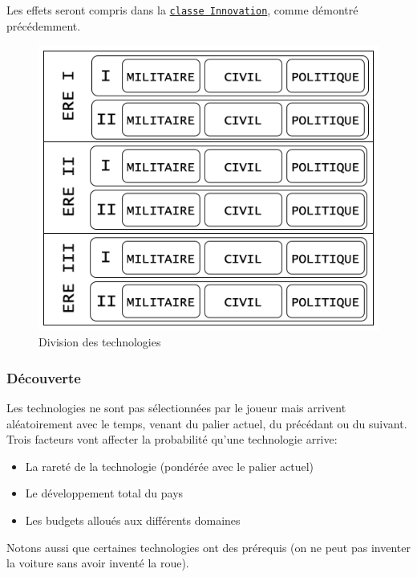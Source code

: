 \documentclass{article}
\newcommand{\ulcolor}[2][class]{\setulcolor{#1}\ul{#2}}
\newcommand{\ulcolor}[2][var]{\setulcolor{#1}\ul{#2}}
\newcommand{\ulcolor}[2][func]{\setulcolor{#1}\ul{#2}}
\newcommand*{\mybox}[2]{\colorbox{#1!30}{\parbox{.98\linewidth}{#2}}}
\newcommand\tab[1][0.5cm]{\hspace*{#1}}
\newcommand{\genbox}[1]{\mybox{verylightgray}{#1}}
\newcommand{\class}[1]{\texttt{\textcolor{codeColour}{\ulcolor[class]{#1}}}}
\begin{document}
                \tab \genbox{
                    Les effets seront compris dans la \class{classe Innovation}, comme démontré précédemment. \\
                }

                \begin{figure}[h]
                    \centering
                        \includegraphics[scale=0.4]{schema_domaines.png}
                        \caption{Division des technologies}
                        \label{fig:x photosysteme}
                \end{figure}
            
            \subsubsection{Découverte}
                Les technologies ne sont pas sélectionnées par le joueur mais arrivent aléatoirement avec le temps, venant du palier actuel, du précédant ou du suivant. Trois facteurs vont affecter la probabilité qu'une technologie arrive:
                    \begin{itemize}
                        \item La rareté de la technologie (pondérée avec le palier actuel)
                        \item Le développement total du pays
                        \item Les budgets alloués aux différents domaines 
                    \end{itemize}
                Notons aussi que certaines technologies ont des prérequis (on ne peut pas inventer la voiture sans avoir inventé la roue). \\
                
\end{document}
